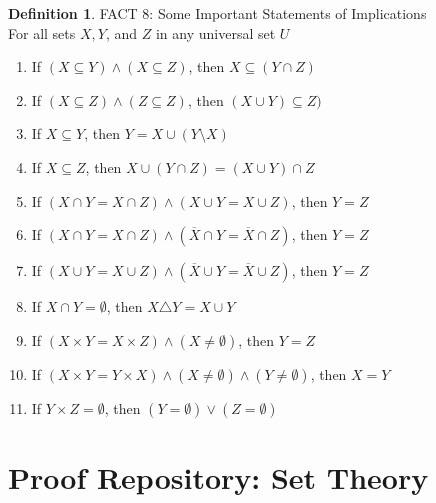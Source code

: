 \documentclass{book}
\theoremstyle{definition}
\newtheorem{definition}{Definition}[section]
\theoremstyle{remark}
\begin{document}
\begin{definition}
FACT 8: Some Important Statements of Implications \\

For all sets $X, Y$, and $Z$ in any universal set $U$ \\

    \begin{enumerate}
        \item If $(X \subseteq Y) \wedge (X \subseteq Z)$, then $X \subseteq (Y \cap Z)$
        \item If $(X \subseteq Z) \wedge (Z \subseteq Z)$, then $(X \cup Y) \subseteq Z)$
        \item If $X \subseteq Y$, then $Y = X \cup (Y \setminus X)$
        \item If $X \subseteq Z$, then $X \cup (Y \cap Z) = (X \cup Y) \cap Z$
        \item If $(X \cap Y = X \cap Z) \wedge (X \cup Y = X \cup Z)$, then $Y = Z$
        \item If $(X \cap Y = X \cap Z) \wedge (\overline{X} \cap Y = \overline{X} \cap Z)$, then $Y = Z$
        \item If $(X \cup Y = X \cup Z) \wedge (\overline{X} \cup Y = \overline{X} \cup Z)$, then $Y = Z$
        \item If $X \cap Y = \emptyset$, then $X \triangle Y = X \cup Y$
        \item If $(X \times Y = X \times Z) \wedge (X \neq \emptyset)$, then $Y = Z$
        \item If $(X \times Y = Y \times X) \wedge (X \neq \emptyset) \wedge (Y \neq \emptyset)$, then $X = Y$
        \item If $Y \times Z = \emptyset$, then $(Y = \emptyset) \vee (Z = \emptyset)$
    \end{enumerate}
\end{definition}





\newpage
\section{Proof Repository: Set Theory}
\end{document}
